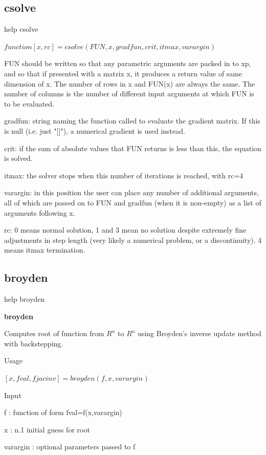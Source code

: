 \documentclass[cn,10pt,math=newtx,citestyle=gb7714-2015,bibstyle=gb7714-2015]{elegantbook}
\begin{document}
{{	\subsection{csolve}
	
	help csolve
	
	$function [x,rc] = csolve(FUN,x,gradfun,crit,itmax,varargin)$
	
	FUN should be written so that any parametric arguments are packed in to xp, and so that if presented with a matrix x, it produces a return value of same dimension of x.  The number of rows in x and FUN(x) are always the same.  The number of columns is the number of different input arguments at which FUN is to be evaluated.
	
	gradfun:  string naming the function called to evaluate the gradient matrix.  If this is null (i.e. just "[]"), a numerical gradient is used instead.
	
	crit:     if the sum of absolute values that FUN returns is less than this, the equation is solved.
	
	itmax:    the solver stops when this number of iterations is reached, with rc=4
	
	varargin: in this position the user can place any number of additional arguments, all of which are passed on to FUN and gradfun (when it is non-empty) as a list of arguments following x.
	
	rc:       0 means normal solution, 1 and 3 mean no solution despite extremely fine adjustments in step length (very likely a numerical problem, or a discontinuity). 4 means itmax termination.
	
	
	\subsection{broyden}
	
	help broyden
	
	\textbf{broyden}
	
	Computes root of function from $R^n$ to $R^n$ using Broyden's inverse update method with backstepping.
	
	Usage
	
	$[x,fval,fjacinv] = broyden(f,x,varargin)$
	
	Input
	
	f         : function of form fval=f(x,varargin)
	
	x         : n.1 initial guess for root
	
	varargin  : optional parameters passed to f
	
}}
\end{document}
